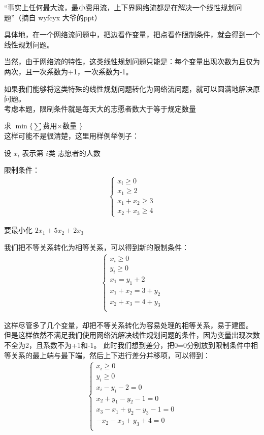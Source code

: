 	“事实上任何最大流，最小费用流，上下界网络流都是在解决一个线性规划问题”（摘自 wyfcyx 大爷的ppt）
	
	具体地，在一个网络流问题中，把边看作变量，把点看作限制条件，就会得到一个线性规划问题。
	
	当然，由于网络流的特性，这类线性规划问题只能是：每个变量出现次数为且仅为两次，且一次系数为+1，一次系数为-1。
	
	如果我们能够将这类特殊的线性规划问题转化为网络流问题，就可以圆满地解决原问题。
	\\
	
	考虑本题，限制条件就是每天大的志愿者数大于等于规定数量
	
	求 $\min\{\sum$费用$\times$数量 $ \}$\\
	
	这样可能不是很清楚，这里用样例举例子：
	
	设 $x_i$ 表示第 $i$类 志愿者的人数
	
	限制条件：
	$$
	\begin{aligned}
	\left\lbrace
	\begin{matrix}
	x_i\ge0\\
	x_1\ge2\\
	x_1+x_2\ge3\\
	x_2+x_3\ge4
	\end{matrix}
	\right.
	\end{aligned}
	$$
	
	要最小化 $2x_1+5x_2+2x_3$
	
	我们把不等关系转化为相等关系，可以得到新的限制条件：
	$$
	\begin{aligned}
	\left\lbrace
	\begin{matrix}
	x_i\ge0\\
	y_i\ge0\\
	x_1=y_1+2\\
	x_1+x_2=3+y_2\\
	x_2+x_3=4+y_3\\
	\end{matrix}
	\right.
	\end{aligned}
	$$
	
	这样尽管多了几个变量，却把不等关系转化为容易处理的相等关系，易于建图。
	但是这样依然不满足我们使用网络流解决线性规划问题的条件，因为变量出现次数不全为2，且系数不为+1和-1。
	此时我们想到差分，把0=0分别放到限制条件中相等关系的最上端与最下端，然后上下进行差分并移项，可以得到：
	$$
	\begin{aligned}
	\left\lbrace
	\begin{matrix}
	x_i\ge0\\
	y_i\ge0\\
	x_i-y_i-2=0\\
	x_2+y_1-y_2-1=0\\
	x_3-x_1+y_2-y_3-1=0\\
	-x_2-x_3+y_3+4=0\\
	\end{matrix}
	\right.
	\end{aligned}
	$$
	
